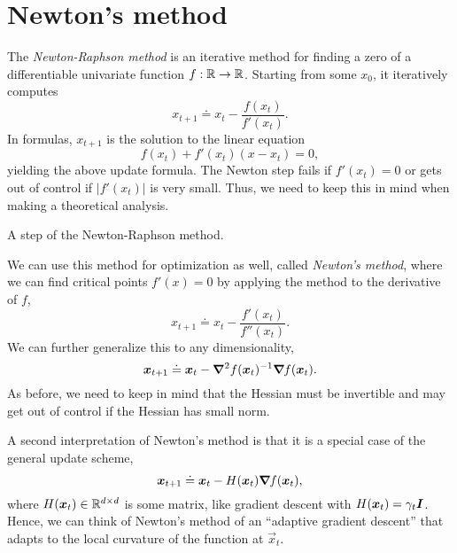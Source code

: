 \section{Newton's method}


The \textit{Newton-Raphson method} is an iterative method for finding a zero of a differentiable
univariate function $f: \mathbb{R} \to \mathbb{R}$. Starting from some $x_0$, it iteratively computes \[
    x_{t+1} \doteq x_t - \frac{f(x_t)}{f'(x_t)}.
\]
In formulas, $x_{t+1}$ is the solution to the linear equation \[
    f(x_t) + f'(x_t) (x - x_t) = 0,
\]
yielding the above update formula. The Newton step fails if $f'(x_t) = 0$ or gets out of control if
$|f'(x_t)|$ is very small. Thus, we need to keep this in mind when making a theoretical analysis.

\begin{marginfigure}
    \centering
    \caption{A step of the Newton-Raphson method.}
    \label{fig:newton-raphson}
\end{marginfigure}

We can use this method for optimization as well, called \textit{Newton's method}, where we can find
critical points $f'(x) = 0$ by applying the method to the derivative of $f$, \[
    x_{t+1} \doteq x_t - \frac{f'(x_t)}{f''(x_t)}.
\]
We can further generalize this to any dimensionality, \[
    \bm{x}_{t+1} \doteq \bm{x}_t - \bm{\nabla}^2_{\! } f(\bm{x}_t)^{-1} \bm{\nabla}_{\! } f(\bm{x}_t).
\]
As before, we need to keep in mind that the Hessian must be invertible and may get out of control
if the Hessian has small norm.

A second interpretation of Newton's method is that it is a special case of the general update
scheme, \[
    \bm{x}_{t+1} \doteq \bm{x}_t - H(\bm{x}_t) \bm{\nabla}_{\! } f(\bm{x}_t),
\]
where $H(\bm{x}_t) \in \mathbb{R}^{d \times d}$ is some matrix, like gradient descent with $H(\bm{x}_t) =
    \gamma_t \bm{I}$. Hence, we can think of Newton's method of an ``adaptive gradient descent'' that
adapts to the local curvature of the function at $\vec{x}_t$.

